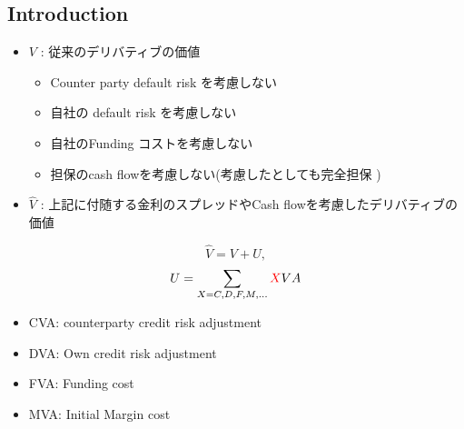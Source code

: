 \documentclass[driverfallback=dvipdfmx,cjk]{beamer}
\begin{document}
\subsection{Introduction}
\begin{frame} 
    \begin{itemize}
        \item $V$ : 従来のデリバティブの価値
            \begin{itemize}
                \item Counter party default risk を考慮しない
                \item 自社の default risk を考慮しない
                \item 自社のFunding コストを考慮しない
                \item 担保のcash flowを考慮しない(考慮したとしても完全担保 )
            \end{itemize}
        \item $\hat{V}$ : 上記に付随する金利のスプレッドやCash flowを考慮したデリバティブの価値
    \end{itemize}
    $$\hat{V} = V + U, $$
    $$U = \sum_{X=C, D, F, M, ...} \textcolor{red}{X}VA$$
    \begin{itemize}
        \item CVA: counterparty credit risk adjustment
        \item DVA: Own credit risk adjustment
        \item FVA: Funding cost
        \item MVA: Initial Margin cost
    \end{itemize}
\end{frame}
\end{document}
